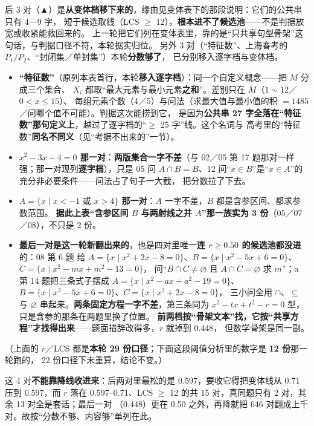 \documentclass[a4paper,11pt]{article}
\providecommand{\tightlist}{%
  \setlength{\itemsep}{0pt}\setlength{\parskip}{0pt}}
\begin{document}
后 3 对（▲）是\textbf{从变体档移下来的}，缘由见变体表下的那段说明：它们的公共串只有 4---9 字，
短于候选取线（LCS $\geqslant$ 12），\textbf{根本进不了候选池}------不是判据放宽或收紧能救回来的。
上一轮把它们列在变体表里，靠的是``只共享句型骨架''这句话，与判据口径不符，本轮据实归位。
另外 3 对（``特征数''、上海春考的 \(P_1/P_2\)、``封闭集／单封集''）本轮\textbf{分数够了}，
已分别移入逐字档与变体档。

\begin{itemize}
\tightlist
\item
  \textbf{``特征数''}（原列本表首行，本轮\textbf{移入逐字档}）：同一个自定义概念------把 \(M\) 分成三个集合、
  \(X_i\) 都取``最大元素与最小元素\textbf{之和}''。差别只在 \(M\)（\(1\sim12\)／\(0<x\leqslant15\)）、
  每组元素个数（4／5）与问法（求最大值与最小值的积 \(=1485\)／问哪个值不可能）。判据这次能捞到它，
  是因为\textbf{公共串 27 字全落在``特征数''那句定义上}，越过了逐字档的``$\geqslant$ 25 字''线。这个名词与
  高考里的``特征数''\textbf{同名不同义}（见``考据不出来的''一节）。
\item
  \textbf{\(x^2-3x-4=0\) 那一对}：\textbf{两版集合一字不差}（与 02／05 第 17 题那对一样强；那一对现列\textbf{逐字档}），只是 05 问
  \(A\cap B=B\)、12 问``\(x\in B\)''是``\(x\in A\)''的充分非必要条件------问法占了句子一大截，
  把分数拉了下去。
\item
  \textbf{\(A=\{x\mid x<-1\text{ 或 }x>4\}\) 那一对}：\(A\) 一字不差，\(B\) 都是含参区间、都求参数范围。
  \textbf{据此上表``含参区间 \(B\) 与两射线之并 \(A\)''那一族实为 3 份}（05／07／08），不只是 2 份。
\item
  \textbf{最后一对是这一轮新翻出来的}，也是四对里唯一\textbf{连 \(r\ge 0.50\) 的候选池都没进}的：08 第 6 题
  给 \(A=\{x\mid x^2+2x-8=0\}\)、\(B=\{x\mid x^2-5x+6=0\}\)、\(C=\{x\mid x^2-mx+m^2-13=0\}\)，
  问``\(B\cap C\neq\varnothing\) 且 \(A\cap C=\varnothing\) 求 \(m\)''；a 第 14 题把三条式子摆成
  \(A=\{x\mid x^2-ax+a^2-19=0\}\)、\(B=\{x\mid x^2-5x+6=0\}\)、\(C=\{x\mid x^2+2x-8=0\}\)，
  三小问全用 \(\cap\)、\(\subseteq\) 与 \(\varnothing\) 串起来。\textbf{两条固定方程一字不差}，第三条同为
  \(x^2-tx+t^2-c=0\) 型，只是含参的那条在两题里换了位置。
  \textbf{前两档按``骨架文本''找，它按``共享方程''才找得出来}------题面措辞改得多，\(r\) 就掉到 0.448，
  但数学骨架是同一副。
\end{itemize}

（上面的 \(r\)／LCS 都是\textbf{本轮 29 份口径}；下面这段阈值分析里的数字是 \textbf{12 份}那一轮跑的，
22 份口径下未重算，结论不变。）

这 4 对\textbf{不能靠降线收进来}：后两对里最松的是 0.597，要收它得把变体线从 0.71 压到 0.597，而
\(r\) 落在 0.597--0.71、LCS $\geqslant$ 12 的共 15 对，真同题只有 2 对，其余 13 对全是套话；最后一对
（0.448）更在 0.50 之外，再降就把 646 对翻成上千对。故按``分数不够、内容够''单列在此。
\end{document}
